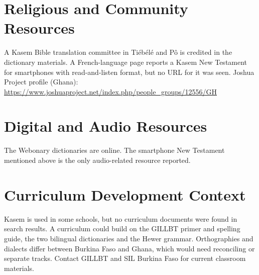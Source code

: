 \documentclass[12pt]{article}
\begin{document}
\section{Religious and Community Resources}
A Kasem Bible translation committee in Ti\'eb\'el\'e and P\^o is credited in the dictionary materials. A French-language page reports a Kasem New Testament for smartphones with read-and-listen format, but no URL for it was seen. Joshua Project profile (Ghana): \url{https://www.joshuaproject.net/index.php/people_groups/12556/GH}

\section{Digital and Audio Resources}
The Webonary dictionaries are online. The smartphone New Testament mentioned above is the only audio-related resource reported.

\section{Curriculum Development Context}
Kasem is used in some schools, but no curriculum documents were found in search results. A curriculum could build on the GILLBT primer and spelling guide, the two bilingual dictionaries and the Hewer grammar. Orthographies and dialects differ between Burkina Faso and Ghana, which would need reconciling or separate tracks. Contact GILLBT and SIL Burkina Faso for current classroom materials.
\end{document}
